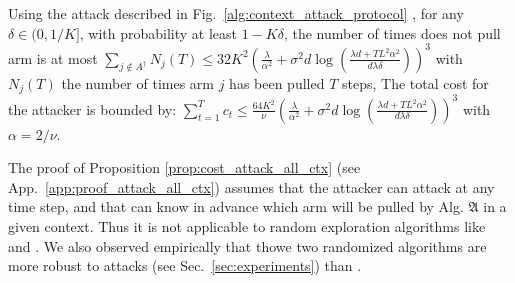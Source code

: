 


\begin{prop}
\label{prop:cost_attack_all_ctx}
	Using the attack described in Fig.~\ref{alg:context_attack_protocol} , for any $\delta\in (0,1/K]$, with probability at least $1 - K\delta$, the number of times \linucb does not pull  arm   is at most     $\sum_{j\notin A^{\dagger}} N_{j}(T) \leq 32K^{2}\left( \frac{\lambda}{\alpha^{2}} + \sigma^{2}d\log\left(\frac{\lambda d + TL^2\alpha^{2}}{d\lambda\delta}\right) \right)^{3}$ 
	with $N_{j}(T)$ the number of times arm $j$ has been pulled $T$ steps, 
The total cost for the attacker is bounded by: $   \sum_{t=1}^{T} c_{t} \leq \frac{64K^{2}}{\nu}\left( \frac{\lambda}{\alpha^{2}} + \sigma^{2}d\log\left(\frac{\lambda d + TL^2\alpha^{2}}{d\lambda\delta}\right) \right)^{3}$ with $\alpha = 2/\nu$. 
\end{prop}

The proof of Proposition \ref{prop:cost_attack_all_ctx} (see App.~\ref{app:proof_attack_all_ctx}) assumes that the attacker can attack at any time step, and that  can know in advance which arm will be pulled by Alg. $\mathfrak{A}$ in a given context. Thus it is not applicable to random exploration algorithms like \lints \cite{agrawal2013thompson} and \epsgreedy.  We also observed empirically that thowe two randomized algorithms are more robust to attacks (see Sec.~\ref{sec:experiments}) than \linucb.

